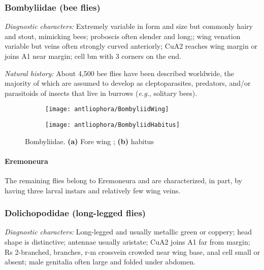 \subsubsection{Bombyliidae (bee flies)}
\noindent{}\textit{Diagnostic characters:} Extremely variable in form and size but commonly hairy and stout, mimicking bees; proboscis often slender and long;; wing venation variable but veins often strongly curved anteriorly; CuA2 reaches wing margin or joins A1 near margin; cell bm with 3 corners on the end.\vspace{3mm}

\noindent{}\textit{Natural history:} About 4,500 bee flies have been described worldwide, the majority of which are assumed to develop as cleptoparasites, predators, and/or parasitoids of insects that live in burrows (\textit{e.g.}, solitary bees).

\begin{figure}[ht!]
    \centering
    \begin{subfigure}[ht!]{0.45\textwidth}
        \texttt{[image: antliophora/BombyliidWing]}
        \caption{}
        \label{fig:bombyl2}
    \end{subfigure}
    \qquad 
    \begin{subfigure}[ht!]{0.4\textwidth}
        \texttt{[image: antliophora/BombyliidHabitus]}
        \caption{}
        \label{fig:bombyl1}
    \end{subfigure}
    \caption{Bombyliidae. \textbf{(a)} Fore wing \citep[][Fig. 45.1]{mcalpine1981manual}; \textbf{(b)} habitus \citep[][Fig. 45.1]{mcalpine1981manual}}\label{fig:bombyls}
\end{figure}

\paragraph{Eremoneura} The remaining flies belong to Eremoneura and are characterized, in part, by having three larval instars and relatively few wing veins.

\subsubsection{Dolichopodidae (long-legged flies)}
\noindent{}\textit{Diagnostic characters:} Long-legged and usually metallic green or coppery; head shape is distinctive; antennae usually aristate; CuA2 joins A1 far from margin; Rs 2-branched, branches, r-m crossvein crowded near wing base, anal cell small or absent; male genitalia often large and folded under abdomen.\vspace{3mm}

